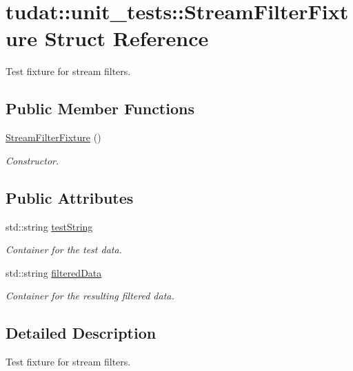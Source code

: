 \hypertarget{structtudat_1_1unit__tests_1_1StreamFilterFixture}{}\section{tudat\+:\+:unit\+\_\+tests\+:\+:Stream\+Filter\+Fixture Struct Reference}
\label{structtudat_1_1unit__tests_1_1StreamFilterFixture}


Test fixture for stream filters.  


\subsection*{Public Member Functions}
\begin{DoxyCompactItemize}
\item 
\hyperlink{structtudat_1_1unit__tests_1_1StreamFilterFixture_aa9f9485470cac6b943d74f9c41b8b7f9}{Stream\+Filter\+Fixture} ()
\begin{DoxyCompactList}\small\item\em Constructor. \end{DoxyCompactList}\end{DoxyCompactItemize}
\subsection*{Public Attributes}
\begin{DoxyCompactItemize}
\item 
std\+::string \hyperlink{structtudat_1_1unit__tests_1_1StreamFilterFixture_aa817cd363468b94a093064bc234b578b}{test\+String}
\begin{DoxyCompactList}\small\item\em Container for the test data. \end{DoxyCompactList}\item 
std\+::string \hyperlink{structtudat_1_1unit__tests_1_1StreamFilterFixture_ac59ec3b6848c92420f0ca247135f22f2}{filtered\+Data}
\begin{DoxyCompactList}\small\item\em Container for the resulting filtered data. \end{DoxyCompactList}\end{DoxyCompactItemize}


\subsection{Detailed Description}
Test fixture for stream filters. 

